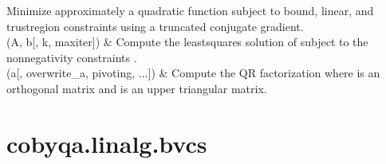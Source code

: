 \documentclass[letterpaper,10pt,english]{sphinxmanual}
\begin{document}
\begin{savenotes}
\begin{longtable}[c]{}
Minimize approximately a quadratic function subject to bound, linear, and trust\sphinxhyphen{}region constraints using a truncated conjugate gradient.
\\
\hline
\sphinxAtStartPar
{\hyperref[\detokenize{refs/generated/cobyqa.linalg.nnls:cobyqa.linalg.nnls}]{}}(A, b{[}, k, maxiter{]})
&
\sphinxAtStartPar
Compute the least\sphinxhyphen{}squares solution of  subject to the nonnegativity constraints .
\\
\hline
\sphinxAtStartPar
{\hyperref[\detokenize{refs/generated/cobyqa.linalg.qr:cobyqa.linalg.qr}]{}}(a{[}, overwrite\_a, pivoting, ...{]})
&
\sphinxAtStartPar
Compute the QR factorization  where  is an orthogonal matrix and  is an upper triangular matrix.
\\
\hline
\end{longtable}\sphinxatlongtableend\end{savenotes}


\section{cobyqa.linalg.bvcs}
\label{\detokenize{refs/generated/cobyqa.linalg.bvcs:cobyqa-linalg-bvcs}}\label{\detokenize{refs/generated/cobyqa.linalg.bvcs::doc}}
\end{document}

